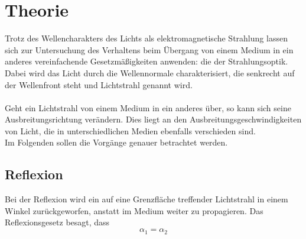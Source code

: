 \section{Theorie}
\label{sec:Theorie}
Trotz des Wellencharakters des Lichts als elektromagnetische Strahlung
lassen sich zur Untersuchung des Verhaltens beim Übergang von einem Medium
in ein anderes vereinfachende Gesetzmäßigkeiten anwenden: die der Strahlungsoptik.\\
Dabei wird das Licht durch die Wellennormale charakterisiert, die senkrecht auf der
Wellenfront steht und Lichtstrahl genannt wird.\\
\\
Geht ein Lichtstrahl von einem Medium in ein anderes über, so kann sich seine
Ausbreitungsrichtung verändern. Dies liegt an den Ausbreitungsgeschwindigkeiten
von Licht, die in unterschiedlichen Medien ebenfalls verschieden sind.\\
Im Folgenden sollen die Vorgänge genauer betrachtet werden.

\subsection{Reflexion}
Bei der Reflexion wird ein auf eine Grenzfläche treffender Lichtstrahl
in einem Winkel zurückgeworfen, anstatt im Medium weiter zu propagieren.
Das Reflexionsgesetz besagt, dass
\begin{equation}
    \alpha_1 = \alpha_2
    \label{eqn:reflexion}
\end{equation}

